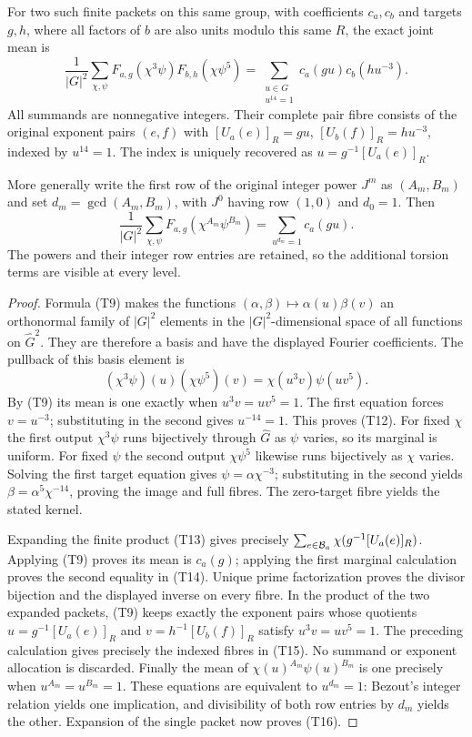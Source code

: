 \begin{theorem}
For two such finite packets on this same group, with coefficients
$c_a,c_b$ and targets $g,h$, where all factors of $b$ are also
units modulo this same $R$, the exact joint mean is
\[
 \frac1{|G|^2}\sum_{\chi,\psi}
    F_{a,g}(\chi^3\psi)F_{b,h}(\chi\psi^5)
   =\sum_{\substack{u\in G\\u^{14}=1}}
          c_a(gu)c_b(hu^{-3}).                       \tag{T15}
\]
All summands are nonnegative integers. Their complete pair fibre
consists of the original exponent pairs $(e,f)$ with
$[U_a(e)]_R=gu$, $[U_b(f)]_R=hu^{-3}$, indexed by $u^{14}=1$.
The index is uniquely recovered as $u=g^{-1}[U_a(e)]_R$.

More generally write the first row of the original integer power
$J^m$ as $(A_m,B_m)$ and set $d_m=\gcd(A_m,B_m)$, with
$J^0$ having row $(1,0)$ and $d_0=1$. Then
\[
 \frac1{|G|^2}\sum_{\chi,\psi}
    F_{a,g}(\chi^{A_m}\psi^{B_m})
       =\sum_{u^{d_m}=1}c_a(gu).                     \tag{T16}
\]
The powers and their integer row entries are retained, so the
additional torsion terms are visible at every level.
\end{theorem}
\begin{proof}
Formula (T9) makes the functions $(\alpha,\beta)\mapsto
\alpha(u)\beta(v)$ an orthonormal family of $|G|^2$ elements
in the $|G|^2$-dimensional space of all functions on
$\widehat G^2$. They are therefore a basis and have the displayed
Fourier coefficients. The pullback of this basis element is
\[
 (\chi^3\psi)(u)(\chi\psi^5)(v)
       =\chi(u^3v)\psi(uv^5).
\]
By (T9) its mean is one exactly when $u^3v=uv^5=1$.
The first equation forces $v=u^{-3}$; substituting in the second
gives $u^{-14}=1$. This proves (T12). For fixed $\chi$ the first
output $\chi^3\psi$ runs bijectively through $\widehat G$ as
$\psi$ varies, so its marginal is uniform. For fixed $\psi$ the
second output $\chi\psi^5$ likewise runs bijectively as $\chi$
varies. Solving the first target equation gives
$\psi=\alpha\chi^{-3}$; substituting in the second yields
$\beta=\alpha^5\chi^{-14}$, proving the image and full fibres.
The zero-target fibre yields the stated kernel.

Expanding the finite product (T13) gives precisely
$\sum_{e\in{\cal B}_a}\chi(g^{-1}[U_a(e)]_R)$.
Applying (T9) proves its mean is $c_a(g)$; applying the first
marginal calculation proves the second equality in (T14).
Unique prime factorization proves the divisor bijection and the
displayed inverse on every fibre. In the product of the two
expanded packets, (T9) keeps exactly the exponent pairs whose
quotients $u=g^{-1}[U_a(e)]_R$ and $v=h^{-1}[U_b(f)]_R$
satisfy $u^3v=uv^5=1$. The preceding calculation gives precisely
the indexed fibres in (T15). No summand or exponent allocation is
discarded. Finally the mean of
$\chi(u)^{A_m}\psi(u)^{B_m}$ is one precisely when
$u^{A_m}=u^{B_m}=1$. These equations are equivalent to
$u^{d_m}=1$: Bezout's integer relation yields one implication,
and divisibility of both row entries by $d_m$ yields the other.
Expansion of the single packet now proves (T16).
\end{proof}

